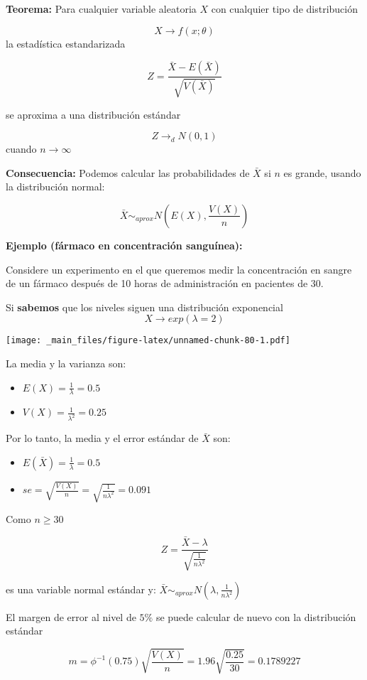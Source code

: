 \documentclass[
]{book}
\providecommand{\tightlist}{%
  \setlength{\itemsep}{0pt}\setlength{\parskip}{0pt}}
\begin{document}
\textbf{Teorema:} Para cualquier variable aleatoria \(X\) con cualquier tipo de distribución

\[X \rightarrow f(x; \theta)\]
la estadística estandarizada

\[Z=\frac{\bar{X}-E(\bar{X})}{\sqrt{V(\bar{X})}}\]

se aproxima a una distribución estándar

\[Z \rightarrow_d N(0,1)\] cuando \(n\rightarrow \infty\)

\textbf{Consecuencia:} Podemos calcular las probabilidades de \(\bar{X}\) si \(n\) es grande, usando la distribución normal:

\[\bar{X} \sim_{aprox} N(E(X), \frac{V(X)}{n})\]

\textbf{Ejemplo (fármaco en concentración sanguínea):}

Considere un experimento en el que queremos medir la concentración en sangre de un fármaco después de 10 horas de administración en pacientes de \(30\).

Si \textbf{sabemos} que los niveles siguen una distribución exponencial \[X \rightarrow exp(\lambda=2)\]

\texttt{[image: \_main\_files/figure-latex/unnamed-chunk-80-1.pdf]}

La media y la varianza son:

\begin{itemize}
\tightlist
\item
  \(E(X)=\frac{1}{\lambda}=0.5\)
\item
  \(V(X)=\frac{1}{\lambda^2}=0.25\)
\end{itemize}

Por lo tanto, la media y el error estándar de \(\bar{X}\) son:

\begin{itemize}
\tightlist
\item
  \(E(\bar{X})=\frac{1}{\lambda}=0.5\)
\item
  \(se=\sqrt{\frac{V(X)}{n}}=\sqrt{\frac{1}{n\lambda^2}}=0.091\)
\end{itemize}

Como \(n \geq 30\)

\[Z=\frac{\bar{X}-\lambda}{\sqrt{\frac{1}{n\lambda^2}}}\]

es una variable normal estándar y: \(\bar{X} \sim_{aprox} N(\lambda, \frac{1}{n\lambda^2})\)

El margen de error al nivel de \(5\%\) se puede calcular de nuevo con la distribución estándar

\[m=\phi^{-1}(0.75) \sqrt{\frac{V(X)}{n}}=1.96\sqrt{\frac{0.25}{30}}=0.1789227\]
\end{document}
